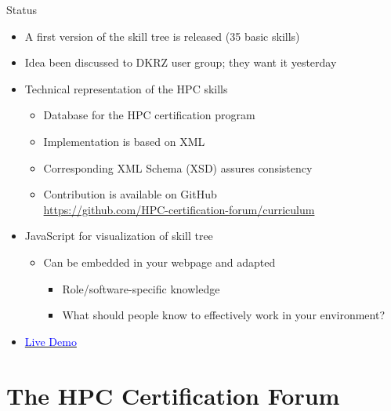 \documentclass[compress,aspectratio=169]{beamer}
\newcommand{\hrefb}[2]{\href{#1}{\textcolor{blue}{#2}}}
\begin{document}
\begin{frame}{Status}
		\begin{block}{}
			\begin{itemize}
				\item A first version of the skill tree is released (35 basic skills)
				\item Idea been discussed to DKRZ user group; they want it yesterday
				\item Technical representation of the HPC skills
				\begin{itemize}
					\item Database for the HPC certification program
					\item Implementation is based on XML
					\item Corresponding XML Schema (XSD) assures consistency
					\item Contribution is available on GitHub \\
					\url{https://github.com/HPC-certification-forum/curriculum}
				\end{itemize}
				\item JavaScript for visualization of skill tree
					\begin{itemize}
						\item Can be embedded in your webpage and adapted
							\begin{itemize}
								\item Role/software-specific knowledge
								\item What should people know to effectively work in your environment?
							\end{itemize}
					\end{itemize}
					\item \hrefb{https://www.hpc-certification.org/skills/}{Live Demo}
			\end{itemize}
		\end{block}
\end{frame}



\section{The HPC Certification Forum}
\sectionIntroHidden
\end{document}
